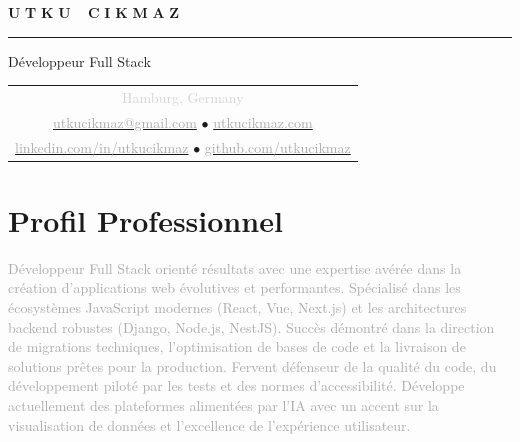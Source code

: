 \documentclass[10pt,a4paper]{article}
\newcommand{\gradientname}[1]{%
  \textcolor{darkgray!90}{\Huge\bfseries U}%
  \textcolor{darkgray!80}{\Huge\bfseries T}%
  \textcolor{darkgray!70}{\Huge\bfseries K}%
  \textcolor{darkgray!60}{\Huge\bfseries U}%
  \textcolor{mediumgray!90}{\Huge\bfseries\ }%
  \textcolor{mediumgray!80}{\Huge\bfseries C}%
  \textcolor{mediumgray!70}{\Huge\bfseries I}%
  \textcolor{mediumgray!60}{\Huge\bfseries K}%
  \textcolor{mediumgray!50}{\Huge\bfseries M}%
  \textcolor{lightgray!80}{\Huge\bfseries A}%
  \textcolor{lightgray!70}{\Huge\bfseries Z}%
}
\begin{document}
\color{black}
\pagestyle{empty}

\begin{center}
  \vspace{-3pt}
  \gradientname{UTKU CIKMAZ}
  
  \vspace{4pt}
  \textcolor{verylightgray}{\rule{0.35\textwidth}{0.6pt}}
  
  \vspace{4pt}
  {\large\color{mediumgray}Développeur Full Stack}
  
  \vspace{5pt}
  \begin{tabular}{c}
    \textcolor{lightgray}{\small Hamburg, Germany} \\[2pt]
    \href{mailto:utkucikmaz@gmail.com}{\textcolor{darkgray}{utkucikmaz@gmail.com}} \quad
    \textcolor{verylightgray}{$\bullet$} \quad
    \href{https://www.utkucikmaz.com}{\textcolor{darkgray}{utkucikmaz.com}} \\[1pt]
    \href{https://linkedin.com/in/utkucikmaz}{\textcolor{darkgray}{linkedin.com/in/utkucikmaz}} \quad
    \textcolor{verylightgray}{$\bullet$} \quad
    \href{https://github.com/utkucikmaz}{\textcolor{darkgray}{github.com/utkucikmaz}}
  \end{tabular}
\end{center}

\vspace{1pt}

\section*{Profil Professionnel}
\vspace{0pt}
\textcolor{darkgray}{%
Développeur Full Stack orienté résultats avec une expertise avérée dans la création d'applications web évolutives et performantes. Spécialisé dans les écosystèmes JavaScript modernes (React, Vue, Next.js) et les architectures backend robustes (Django, Node.js, NestJS). Succès démontré dans la direction de migrations techniques, l'optimisation de bases de code et la livraison de solutions prêtes pour la production. Fervent défenseur de la qualité du code, du développement piloté par les tests et des normes d'accessibilité. Développe actuellement des plateformes alimentées par l'IA avec un accent sur la visualisation de données et l'excellence de l'expérience utilisateur.
}
\vspace{1pt}

\end{document}
